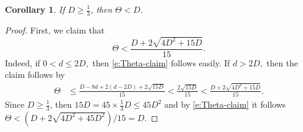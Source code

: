 \documentclass[10pt,a4paper]{article}
\newtheorem{corollary}{Corollary}[section]
\numberwithin{equation}{section}
\begin{document}
\begin{corollary}\label{c:ThetaD}
If $D\ge\frac13$, then $\Theta<D$.
\end{corollary}
\begin{proof}
First, we claim that 
\begin{equation}\label{e:Theta-claim}
	\Theta < \frac{D + 2\sqrt{4D^2 + 15D}}{15} .
\end{equation}
Indeed, if $0 < d \leq 2D,$ then \eqref{e:Theta-claim} follows easily. If $d > 2D,$ then the claim follows by
\begin{align*}
	\Theta &\leq \frac{D - 8d + 2(d - 2D) + 2\sqrt{15D}}{15}  <  \frac{2\sqrt{15D}}{15} < \frac{D + 2\sqrt{4D^2 + 15D}}{15} .
\end{align*}
Since $D\ge\frac13$, then $15D = 45\times \frac{1}{3} D \leq 45 D^2$
and by \eqref{e:Theta-claim} it follows $\Theta < (D + 2\sqrt{4D^2 + 45D^2})/15 = D$.
\end{proof}
\end{document}
